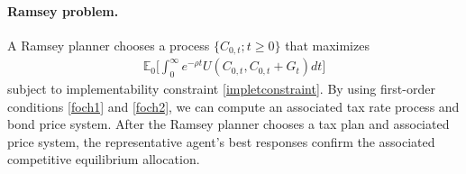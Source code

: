 \documentclass[12pt]{article}
\begin{document}



\paragraph{Ramsey problem.}
A Ramsey planner chooses a process   $ {\{C_{0, t}; t \geq 0\}}$  that maximizes 
\begin{align} \label{obj}
	\mathbb{E}_0 \bigg[ \int_{0}^{\infty}  e^{-\rho t} U(C_{0, t}, C_{0, t}+G_t) dt  \bigg]%
\end{align} %
subject to 
implementability constraint \eqref{impletconstraint}.  By using first-order conditions
\eqref{foch1} and \eqref{foch2}, we can 
compute  an associated tax rate process and bond price system. 
After the Ramsey planner chooses   a tax  plan and associated price system,  
the representative agent's best  responses confirm the associated  competitive equilibrium allocation.
\end{document}
